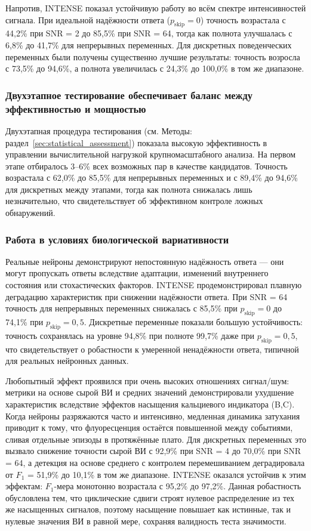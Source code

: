 Напротив, INTENSE показал устойчивую работу во всём спектре
интенсивностей сигнала. При идеальной надёжности ответа ($p_{\text{skip}} = 0$)
точность возрастала с 44,2\% при SNR = 2 до 85,5\% при SNR = 64, тогда как полнота
улучшалась с 6,8\% до 41,7\% для непрерывных переменных.
Для дискретных поведенческих переменных были получены существенно лучшие результаты: точность возросла с 73,5\% до
94,6\%, а полнота увеличилась с 24,3\% до 100,0\% в том же
диапазоне.

\subsubsection{Двухэтапное тестирование обеспечивает баланс между эффективностью и мощностью}
\label{sec:two_stage_testing}

Двухэтапная процедура тестирования (см. Методы: раздел~\ref{sec:statistical_assessment})
показала высокую эффективность в управлении
вычислительной нагрузкой крупномасштабного анализа. На первом этапе отбиралось 3--6\%
всех возможных пар в качестве кандидатов.
Точность возрастала с 62,0\% до 85,5\% для непрерывных переменных и с 89,4\% до 94,6\%
для дискретных между этапами, тогда как полнота снижалась лишь незначительно, что свидетельствует об
эффективном контроле ложных обнаружений.

\subsubsection{Работа в условиях биологической вариативности}
\label{sec:performance_variability}

Реальные нейроны демонстрируют непостоянную надёжность ответа --- они могут пропускать ответы вследствие
адаптации, изменений внутреннего состояния или стохастических факторов. INTENSE продемонстрировал
плавную деградацию характеристик при снижении надёжности ответа. При SNR = 64
точность для непрерывных переменных снижалась с 85,5\% при $p_{\text{skip}} = 0$ до
74,1\% при $p_{\text{skip}} = 0,5$. Дискретные переменные показали большую устойчивость:
точность сохранялась на уровне 94,8\% при полноте 99,7\% даже при $p_{\text{skip}} = 0,5$,
что свидетельствует о робастности к умеренной ненадёжности ответа, типичной для реальных нейронных данных.

Любопытный эффект проявился при очень высоких отношениях сигнал/шум: метрики на основе сырой ВИ
и средних значений демонстрировали ухудшение характеристик вследствие эффектов насыщения кальциевого
индикатора (B,C). Когда нейроны разряжаются часто
и интенсивно, медленная динамика затухания приводит к тому, что флуоресценция остаётся повышенной между событиями,
сливая отдельные эпизоды в протяжённые плато. Для дискретных переменных это вызвало
снижение точности сырой ВИ с 92,9\% при SNR = 4 до 70,0\% при SNR = 64, а
детекция на основе среднего с контролем перемешиванием деградировала от $F_1$ = 51,9\% до
10,1\% в том же диапазоне. INTENSE оказался устойчив к этим эффектам: $F_1$-мера монотонно возрастала
с 95,2\% до 97,2\%. Данная робастность обусловлена тем, что циклические
сдвиги строят нулевое распределение из тех же насыщенных сигналов, поэтому насыщение
повышает как истинные, так и нулевые значения ВИ в равной мере, сохраняя валидность
теста значимости.

